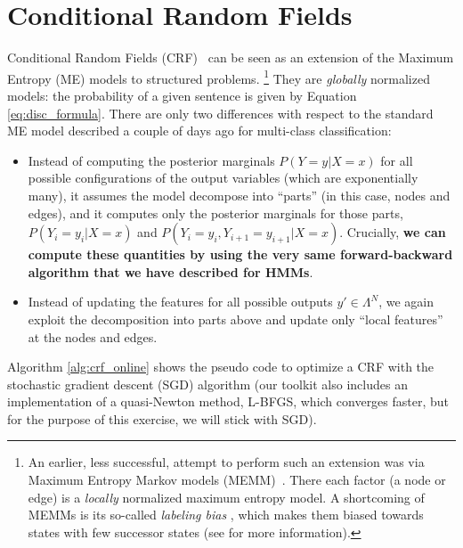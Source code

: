 \section{\label{s:crf}Conditional Random Fields}

Conditional Random Fields (CRF)~\citep{lafferty2001conditional} can be seen
as an extension of the Maximum Entropy (ME) models  to structured problems.%
\footnote{An earlier, less successful, attempt to perform such an extension was via Maximum Entropy Markov
models (MEMM)~\citep{mccallum2000maximum}. There each factor (a node or edge) 
is a \emph{locally} normalized maximum entropy model. A shortcoming of MEMMs is its 
so-called \emph{labeling bias} \citep{Bottou1991}, which makes them biased towards states
with few successor states (see \cite{lafferty2001conditional} for more information).}
They are \emph{globally} normalized models: the probability of a given
sentence is given by Equation \ref{eq:disc_formula}. 
There are only two differences with respect to the standard ME model 
described a couple of days ago for multi-class classification: 
\begin{itemize}
\item Instead of computing the posterior marginals $P(Y=y|X=x)$ for all possible configurations
of the output variables (which are exponentially many), it 
assumes the model decompose into ``parts'' (in this case, nodes and edges), and it computes only 
the posterior marginals for those parts, 
  $P(Y_i=y_i | X=x)$ and  $P(Y_i=y_i, Y_{i+1}=y_{i+1}| X=x)$. 
Crucially, \textbf{we can compute these quantities by using the very same forward-backward algorithm that we have described for HMMs}.
\item Instead of updating the features for all possible outputs $y' \in \Lambda^N$, 
we again exploit the decomposition into parts above and update only 
``local features'' at the nodes and edges.
\end{itemize}

Algorithm
\ref{alg:crf_online} shows the pseudo code to optimize a CRF with 
the stochastic gradient descent (SGD) algorithm  
(our toolkit also includes an implementation of a quasi-Newton method, L-BFGS, 
which converges faster, but for the purpose of this exercise, we will 
stick with SGD). 

